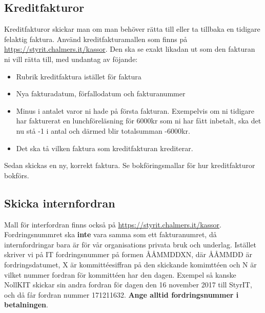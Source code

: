\documentclass{article}
\begin{document}
\subsection{Kreditfakturor}
Kreditfakturor skickar man om man behöver rätta till eller ta tillbaka en tidigare felaktig faktura. Använd kreditfakturamallen som finns på \url{https://styrit.chalmers.it/kassor}. Den ska se exakt likadan ut som den fakturan ni vill rätta till, med undantag av föjande: 
\begin{itemize}
    \item Rubrik kreditfaktura istället för faktura
    \item Nya fakturadatum, förfallodatum och fakturanummer
    \item Minus i antalet varor ni hade på första fakturan. Exempelvis om ni tidigare har fakturerat en lunchföreläsning för 6000kr som ni har fått inbetalt, ska det nu stå -1 i antal och därmed blir totalsumman -6000kr. 
    \item Det ska tå vilken faktura som kreditfakturan krediterar. 
\end{itemize}
Sedan skickas en ny, korrekt faktura. Se bokföringsmallar för hur kreditfakturor bokförs. 

\subsection{Skicka internfordran}
Mall för interfordran finns också på \url{https://styrit.chalmers.it/kassor}. Fordringsnummret ska \textbf{inte} vara samma som ett fakturanumret, då internfordringar bara är för vår organisations privata bruk och underlag. Istället skriver vi på IT fordringsnummer på formen ÅÅMMDDXN, där ÅÅMMDD är fordringsdatumet, X är kommittéesiffran på den skickande komimttéen och N är vilket nummer fordran för kommittéen har den dagen. Exempel så kanske NollKIT skickar sin andra fordran för dagen den 16 november 2017  till StyrIT, och då får fordran nummer 171211632. \textbf{Ange alltid fordringsnummer i betalningen}. \\

\end{document}
